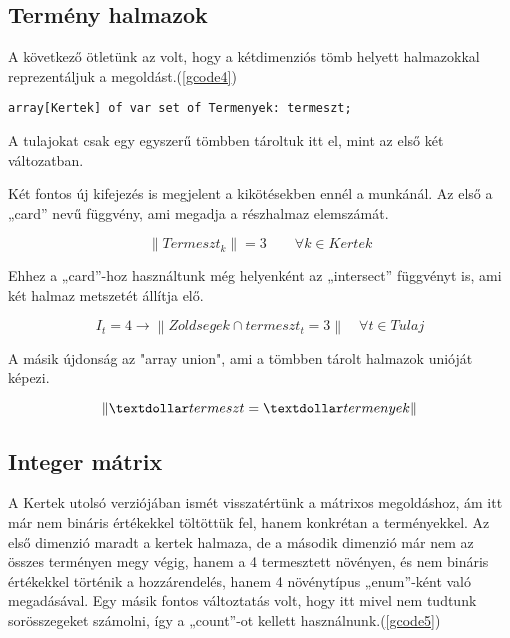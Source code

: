 \documentclass[12pt,a4paper]{report}
\begin{document}
\subsection{Termény halmazok}

    A következő ötletünk az volt, hogy a kétdimenziós tömb helyett halmazokkal reprezentáljuk a megoldást.(\ref{gcode4})

    \begin{lstlisting}[caption=Halmaz definiálása, label=gcode4]
    array[Kertek] of var set of Termenyek: termeszt;
    \end{lstlisting}

    A tulajokat csak egy egyszerű tömbben tároltuk itt el, mint az első két változatban.

    Két fontos új kifejezés is megjelent a kikötésekben ennél a munkánál.
    Az első a „card” nevű függvény, ami megadja a részhalmaz elemszámát.

    \begin{equation}
    \left\| Termeszt_k \right\| =3 \qquad \forall k \in Kertek
    \end{equation}

    Ehhez a „card”-hoz használtunk még helyenként az „intersect” függvényt is, ami két halmaz metszetét állítja elő.

    \begin{equation}
    I_t=4 \rightarrow \left\| Zoldsegek \cap termeszt_t =3 \right\| \quad \forall t \in Tulaj
    \end{equation}

    A másik újdonság az "array union", ami a tömbben tárolt halmazok unióját képezi.
    
    \begin{equation}
     \left\| \textdollar termeszt= \textdollar termenyek \right\| 
    \end{equation}

\subsection{Integer mátrix}

    A Kertek utolsó verziójában ismét visszatértünk a mátrixos megoldáshoz, ám itt már nem bináris értékekkel töltöttük fel, hanem konkrétan a terményekkel.
    Az első dimenzió maradt a kertek halmaza, de a második dimenzió már nem az összes terményen megy végig, hanem a 4 termesztett növényen, és nem bináris értékekkel történik a hozzárendelés, hanem 4 növénytípus „enum”-ként való megadásával.
    Egy másik fontos változtatás volt, hogy itt mivel nem tudtunk sorösszegeket számolni, így a „count”-ot kellett használnunk.(\ref{gcode5})
\end{document}
